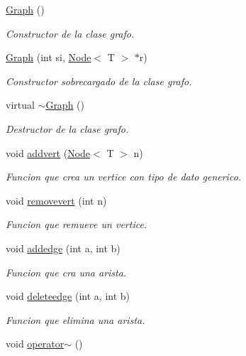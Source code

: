 \begin{DoxyCompactItemize}
\item 
\hyperlink{class_graph_a8c626ac04708ae490bba05e1e713cda2}{Graph} ()
\begin{DoxyCompactList}\small\item\em Constructor de la clase grafo. \end{DoxyCompactList}\item 
\hyperlink{class_graph_a585e445e85bb506fc9b6687c15b0fbd1}{Graph} (int si, \hyperlink{class_node}{Node}$<$ T $>$ $\ast$r)
\begin{DoxyCompactList}\small\item\em Constructor sobrecargado de la clase grafo. \end{DoxyCompactList}\item 
virtual \hyperlink{class_graph_abed0ed996798032aa7dca0069a59b9d6}{$\sim$\+Graph} ()
\begin{DoxyCompactList}\small\item\em Destructor de la clase grafo. \end{DoxyCompactList}\item 
void \hyperlink{class_graph_a098e38adb75a1ede80b702ae311d3c43}{addvert} (\hyperlink{class_node}{Node}$<$ T $>$ n)
\begin{DoxyCompactList}\small\item\em Funcion que crea un vertice con tipo de dato generico. \end{DoxyCompactList}\item 
void \hyperlink{class_graph_a8051c17deea5499aff88e199eb7528a6}{removevert} (int n)
\begin{DoxyCompactList}\small\item\em Funcion que remueve un vertice. \end{DoxyCompactList}\item 
void \hyperlink{class_graph_aa0b173e1e6ba14e5290e32934a4dbc53}{addedge} (int a, int b)
\begin{DoxyCompactList}\small\item\em Funcion que cra una arista. \end{DoxyCompactList}\item 
void \hyperlink{class_graph_a43b6c33a27b9315e1559c2c611e86b47}{deleteedge} (int a, int b)
\begin{DoxyCompactList}\small\item\em Funcion que elimina una arista. \end{DoxyCompactList}\item 
void \hyperlink{class_graph_afb25283ef93b65359d82762c62dc2f27}{operator$\sim$} ()

\end{DoxyCompactItemize}
